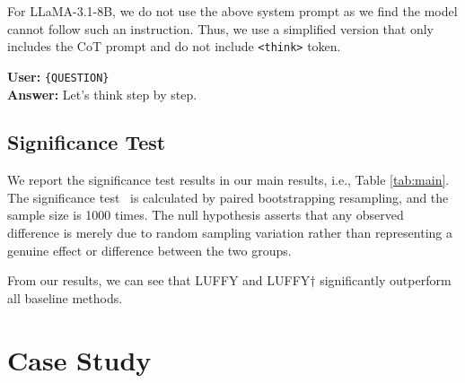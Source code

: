 For LLaMA-3.1-8B, we do not use the above system prompt as we find the model cannot follow such an instruction. Thus, we use a simplified version that only includes the CoT prompt and do not include \verb|<think>| token. 
\begin{tcolorbox}[
    center,
    arc=0mm,
    boxrule=1pt,
    colback=blue!6!white,
    colframe=black,
    colbacktitle=black,
    attach boxed title to top left={yshift=-0.1in,xshift=0.15in},
    boxed title style={boxrule=0pt,colframe=white}
]
\textbf{User: }\verb|{QUESTION}| \\
\textbf{Answer:} Let's think step by step.
\end{tcolorbox}


\subsection{Significance Test}
\label{app:sig_test}
We report the significance test results in our main results, i.e., Table \ref{tab:main}. The significance test~\cite{significance_test} is calculated by paired bootstrapping resampling, and the sample size is 1000 times. The null hypothesis asserts that any observed difference is merely due to random sampling variation rather than representing a genuine effect or difference between the two groups.

From our results, we can see that LUFFY and LUFFY$\dagger$ significantly outperform all baseline methods. 


\section{Case Study} \label{app:case}

